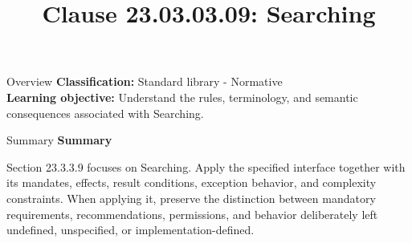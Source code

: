 \documentclass[10pt,letterpaper]{article}
\title{Clause 23.03.03.09: Searching}
\author{}
\date{}
\begin{document}
\maketitle
\begin{CornellOverviewBox}{Overview}
\textbf{Classification:} Standard library - Normative\\[2pt]
\textbf{Learning objective:} Understand the rules, terminology, and semantic consequences associated with Searching.
\end{CornellOverviewBox}\begin{CornellSummaryBox}{Summary}
{\sffamily\bfseries\color{Accent} Summary}\par\vspace{3pt}Section 23.3.3.9 focuses on Searching. Apply the specified interface together with its mandates, effects, result conditions, exception behavior, and complexity constraints. When applying it, preserve the distinction between mandatory requirements, recommendations, permissions, and behavior deliberately left undefined, unspecified, or implementation-defined.
\end{CornellSummaryBox}
\end{document}
